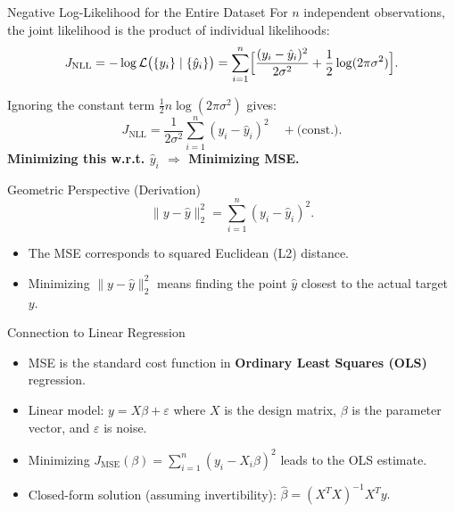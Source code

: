 \documentclass{beamer}
\begin{document}
\begin{frame}{Negative Log-Likelihood for the Entire Dataset}
For \(n\) independent observations, the joint likelihood is the product of individual likelihoods:
\[
J_{\text{NLL}} = -\log \mathcal{L}\bigl(\{y_i\}\mid\{\hat{y}_i\}\bigr) 
= \sum_{i=1}^{n} \Bigl[\frac{(y_i - \hat{y}_i)^2}{2\sigma^2} 
+ \frac{1}{2} \log (2 \pi \sigma^2)\Bigr].
\]

Ignoring the constant term \(\tfrac{1}{2} n \log (2\pi\sigma^2)\) gives:
\[
J_{\text{NLL}} = \frac{1}{2\sigma^2} \sum_{i=1}^n (y_i - \hat{y}_i)^2 
\quad + \text{(const.)}.
\]
\textbf{Minimizing this w.r.t. \(\hat{y}_i\) \(\Longrightarrow\) Minimizing MSE.}
\end{frame}

\begin{frame}{Geometric Perspective (Derivation)}
\[
\| y - \hat{y} \|_2^2 = \sum_{i=1}^{n} (y_i - \hat{y}_i)^2.
\]

\begin{itemize}
  \item The MSE corresponds to squared Euclidean (L2) distance.
  \item Minimizing \(\| y - \hat{y} \|_2^2\) means finding the point \(\hat{y}\) closest to the actual target \(y\).
\end{itemize}
\end{frame}

\begin{frame}{Connection to Linear Regression}
\begin{itemize}
  \item MSE is the standard cost function in \textbf{Ordinary Least Squares (OLS)} regression.
  \item Linear model: \( y = X\beta + \varepsilon \) 
    where \(X\) is the design matrix, \(\beta\) is the parameter vector, and \(\varepsilon\) is noise.
  \item Minimizing 
    \(\displaystyle J_{\text{MSE}}(\beta) = \sum_{i=1}^{n} (y_i - X_i \beta)^2\)
    leads to the OLS estimate.
  \item Closed-form solution (assuming invertibility): 
    \(\displaystyle \hat{\beta} = (X^T X)^{-1} X^T y.\)
\end{itemize}
\end{frame}
\end{document}
